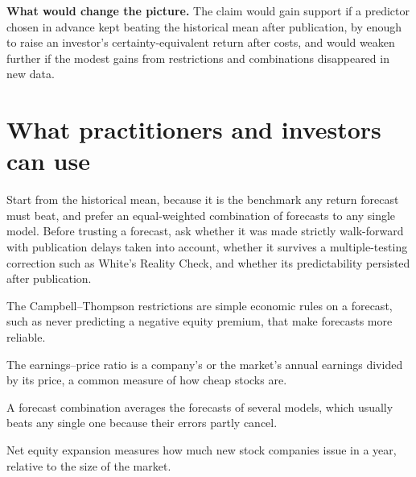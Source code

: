\textbf{What would change the picture.} The claim would gain support if a predictor chosen in advance kept beating the historical mean after publication, by enough to raise an investor's certainty-equivalent return after costs, and would weaken further if the modest gains from restrictions and combinations disappeared in new data.

\section{What practitioners and investors can use}
\label{sec:09-investors}

Start from the historical mean, because it is the benchmark any return forecast must beat, and prefer an equal-weighted combination of forecasts to any single model. Before trusting a forecast, ask whether it was made strictly walk-forward with publication delays taken into account, whether it survives a multiple-testing correction such as White's Reality Check, and whether its predictability persisted after publication.

\makeatletter
{}
\makeatother

\begin{keyterms}
\small
\begin{description}[leftmargin=0pt, itemsep=2pt, parsep=0pt, font=\normalfont\bfseries\color{FEMaroon}]
  \item[Campbell--Thompson restrictions.] The Campbell--Thompson restrictions are simple economic rules on a forecast, such as never predicting a negative equity premium, that make forecasts more reliable.
  \item[Earnings--price ratio.] The earnings--price ratio is a company's or the market's annual earnings divided by its price, a common measure of how cheap stocks are.
  \item[Forecast combination.] A forecast combination averages the forecasts of several models, which usually beats any single one because their errors partly cancel.
  \item[Net equity expansion.] Net equity expansion measures how much new stock companies issue in a year, relative to the size of the market.
\end{description}
\end{keyterms}
